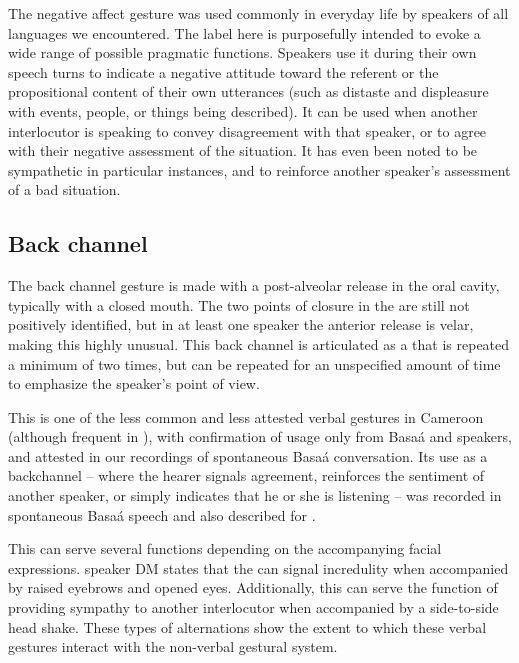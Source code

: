 \documentclass[output=paper
,newtxmath
,modfonts
,nonflat]{langsci/langscibook}
\begin{document}


The negative affect gesture was used commonly in everyday life by speakers of all languages we encountered. The label here is purposefully intended to evoke a wide range of possible pragmatic functions. Speakers use it during their own speech turns to indicate a negative attitude toward the referent or the propositional content of their own utterances (such as distaste and displeasure with events, people, or things being described). It can be used when another interlocutor is speaking to convey disagreement with that speaker, or to agree with their negative assessment of the situation. It has even been noted to be sympathetic in particular instances, and to reinforce another speaker's assessment of a bad situation. %

\subsection{Back channel}

The back channel gesture is made with a post-alveolar release in the oral cavity, typically with a closed mouth. The two points of closure in the  are still not positively identified, but in at least one speaker the anterior release is velar, making this  highly unusual. This back channel is articulated as a  that is repeated a minimum of two times, but can be repeated for an unspecified amount of time to emphasize the speaker's point of view. 

This is one of the less common and less attested verbal gestures in Cameroon (although frequent in ), with confirmation of usage only from Basa\'a and  speakers, and attested in our recordings of spontaneous Basa\'{a} conversation. Its use as a backchannel -- where the hearer signals agreement, reinforces the sentiment of another speaker, or simply indicates that he or she is listening -- was recorded in spontaneous Basa\'{a} speech and also described for .

This  can serve several functions depending on the accompanying facial expressions.  speaker DM  states that the  can signal incredulity when accompanied by raised eyebrows and opened eyes. Additionally, this  can serve the function of providing sympathy to another interlocutor when accompanied by a side-to-side head shake. These types of alternations show the extent to which these verbal gestures interact with the non-verbal gestural system. 
\end{document}
